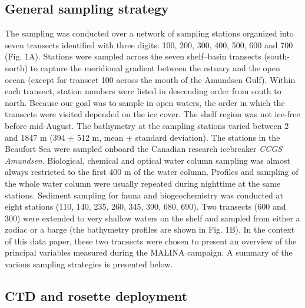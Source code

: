 \documentclass[essd, manuscript]{copernicus}
\begin{document}
\subsection{General sampling strategy}

The sampling was conducted over a network of sampling stations organized into seven transects identified with three digits: 100, 200, 300, 400, 500, 600 and 700 (Fig. 1A). Stations were sampled across the seven shelf–basin transects (south-north) to capture the meridional gradient between the estuary and the open ocean (except for transect 100 across the mouth of the Amundsen Gulf). Within each transect, station numbers were listed in descending order from south to north. Because our goal was to sample in open waters, the order in which the transects were visited depended on the ice cover. The shelf region was not ice-free before mid-August. The bathymetry at the sampling stations varied between 2 and 1847 m (394 $\pm$ 512 m, mean $\pm$ standard deviation). The stations in the Beaufort Sea were sampled onboard the Canadian research icebreaker \textit{CCGS Amundsen}. Biological, chemical and optical water column sampling was almost always restricted to the first 400 m of the water column. Profiles and sampling of the whole water column were usually repeated during nighttime at the same stations. Sediment sampling for fauna and biogeochemistry was conducted at eight stations (110, 140, 235, 260, 345, 390, 680, 690). Two transects (600 and 300) were extended to very shallow waters on the shelf and sampled from either a zodiac or a barge (the bathymetry profiles are shown in Fig. 1B). In the context of this data paper, these two transects were chosen to present an overview of the principal variables measured during the MALINA campaign. A summary of the various sampling strategies is presented below.

\subsection{CTD and rosette deployment}
\end{document}
